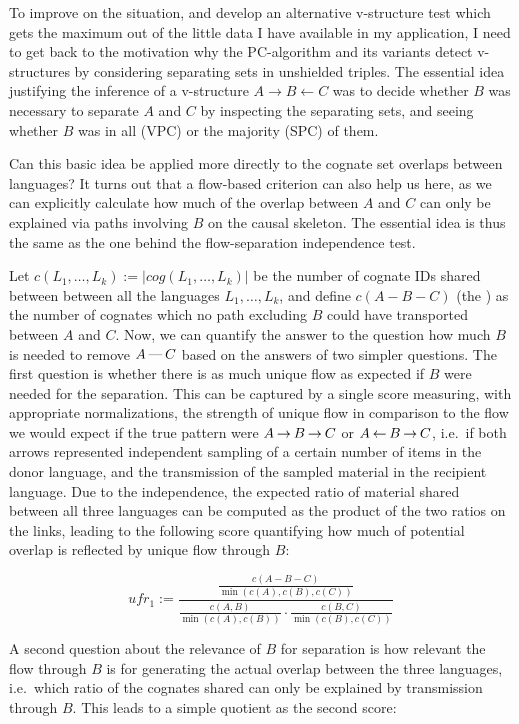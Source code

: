 To improve on the situation, and develop an alternative v-structure test which gets the maximum out of the little data I have available in my application, I need to get back to the motivation why the PC-algorithm and its variants detect v-structures by considering separating sets in unshielded triples. The essential idea justifying the inference of a v-structure $A \rightarrow B \leftarrow C$ was to decide whether $B$ was necessary to separate $A$ and $C$ by inspecting the separating sets, and seeing whether $B$ was in all (VPC) or the majority (SPC) of them.

Can this basic idea be applied more directly to the cognate set overlaps between languages? It turns out that a flow-based criterion can also help us here, as we can explicitly calculate how much of the overlap between $A$ and $C$ can only be explained via paths involving $B$ on the causal skeleton. The essential idea is thus the same as the one behind the flow-separation independence test.

Let $c(L_1,\dots,L_k) := |cog(L_1,\dots,L_k)|$ be the number of cognate IDs shared between between all the languages $L_1,\dots,L_k$, and define $c(A-B-C)$ (the \textit{}) as the number of cognates which no path excluding $B$ could have transported between $A$ and $C$. Now, we can quantify the answer to the question how much $B$ is needed to remove $A \kern 2pt\hbox{---}\kern 2pt C$ based on the answers of two simpler questions. The first question is whether there is as much unique flow as expected if $B$ were needed for the separation. This can be captured by a single score measuring, with appropriate normalizations, the strength of unique flow in comparison to the flow we would expect if the true pattern were $A \kern 2pt\hbox{$\rightarrow$}\kern 2pt B \kern 2pt\hbox{$\rightarrow$}\kern 2pt C$ or $A \kern 2pt\hbox{$\leftarrow$}\kern 2pt B \kern 2pt\hbox{$\rightarrow$}\kern 2pt C$, i.e.\ if both arrows represented independent sampling of a certain number of items in the donor language, and the transmission of the sampled material in the recipient language. Due to the independence, the expected ratio of material shared 
between all three languages can be computed as the product of the two ratios on the links, leading to the following score quantifying how much of potential overlap is reflected by unique flow through $B$:

\begin{equation}
 ufr_1 := \frac{\frac{c(A-B-C)}{\min(c(A),c(B),c(C))}}
	      {\frac{c(A,B)}{\min(c(A),c(B))}\cdot\frac{c(B,C)}{\min(c(B),c(C))}}
\end{equation}

A second question about the relevance of $B$ for separation is how relevant the flow through $B$ is for generating the actual overlap between the three languages, i.e.\ which ratio of the cognates shared can only be explained by transmission through $B$. This leads to a simple quotient as the second score:

